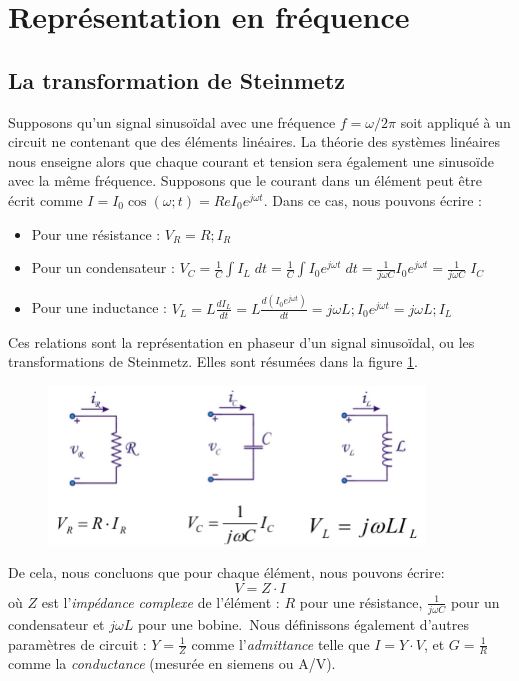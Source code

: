 \section{Représentation en fréquence}
\subsection{La transformation de Steinmetz}
Supposons qu'un signal sinusoïdal avec une fréquence $f = \omega/2\pi$ soit appliqué à un circuit ne contenant que des éléments linéaires. La théorie des systèmes linéaires nous enseigne alors que chaque courant et tension sera également une sinusoïde avec la même fréquence. Supposons que le courant dans un élément peut être écrit comme $I = I_0 \cos(\omega ; t) = Re{I_0 e^{j\omega t}}$. Dans ce cas, nous pouvons écrire :
\begin{itemize}
	\item Pour une résistance : $V_R = R ; I_R$
	\item Pour un condensateur : $V_C = \frac{1}{C} \int I_L \; dt = \frac{1}{C} \int I_0 e^{j\omega t} \; dt = \frac{1}{j\omega C} I_0 e^{j\omega t} = \frac{1}{j\omega C} \; I_C$
	\item Pour une inductance : $V_L = L \frac{dI_L}{dt} = L \frac{d(I_0 e^{j\omega t})}{dt} = j \omega L ; I_0 e^{j\omega t} = j \omega L ; I_L$
\end{itemize}
Ces relations sont la représentation en phaseur d'un signal sinusoïdal, ou les transformations de Steinmetz. Elles sont résumées dans la figure \ref{fig:steinmetz}.

\begin{figure}[h!]
	\centering
	\includegraphics[width=10cm]{figures/ch00/steinmetz.jpg}
	\caption{}
	\label{fig:steinmetz}
\end{figure}

De cela, nous concluons que pour chaque élément, nous pouvons écrire:
$$
V = Z \cdot I
$$
où $Z$ est l'\emph{impédance complexe} de l'élément : $R$ pour une résistance, $\frac{1}{j\omega C}$ pour un condensateur et $j\omega L$ pour une bobine.\
Nous définissons également d'autres paramètres de circuit : $Y = \frac{1}{Z}$ comme l'\emph{admittance} telle que $I = Y \cdot V$, et $G = \frac{1}{R}$ comme la \emph{conductance} (mesurée en siemens ou A/V).

